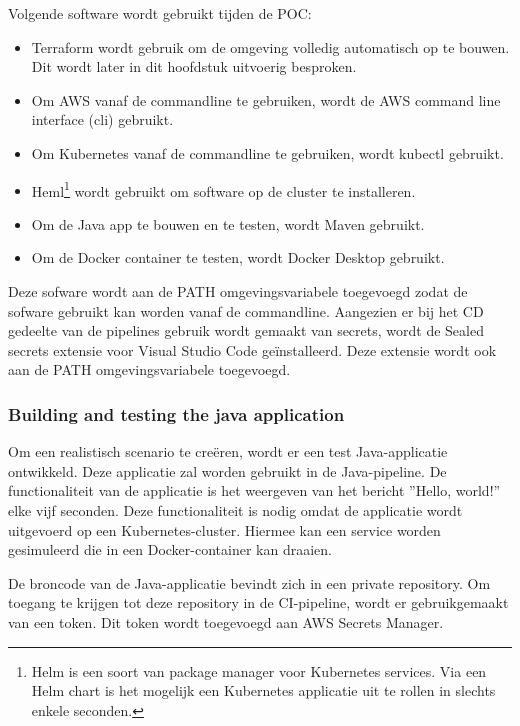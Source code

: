 Volgende software wordt gebruikt tijden de POC:

\begin{itemize}
  \item Terraform wordt gebruik om de omgeving volledig automatisch op te bouwen. Dit wordt later in dit hoofdstuk uitvoerig besproken.
  \item Om AWS vanaf de commandline te gebruiken, wordt de AWS command line interface (cli) gebruikt. 
  \item Om Kubernetes vanaf de commandline te gebruiken, wordt kubectl gebruikt.
  \item Heml\footnote{Helm is een soort van package manager voor Kubernetes services. Via een Helm chart is het mogelijk een Kubernetes applicatie uit te rollen in slechts enkele seconden.} wordt gebruikt om software op de cluster te installeren.
  \item Om de Java app te bouwen en te testen, wordt Maven gebruikt.
  \item Om de Docker container te testen, wordt Docker Desktop gebruikt.
\end{itemize}

Deze sofware wordt aan de PATH omgevingsvariabele toegevoegd zodat de sofware gebruikt kan worden vanaf de commandline. Aangezien er bij het CD gedeelte van de pipelines gebruik wordt gemaakt van secrets, wordt de Sealed secrets extensie voor Visual Studio Code geïnstalleerd. Deze extensie wordt ook aan de PATH omgevingsvariabele toegevoegd.

\subsubsection{
{Building and testing the java application}}
\label{sec:Bouwen en testen van de applicatie}

Om een realistisch scenario te creëren, wordt er een test Java-applicatie ontwikkeld. Deze applicatie zal worden gebruikt in de Java-pipeline. De functionaliteit van de applicatie is het weergeven van het bericht ''Hello, world!'' elke vijf seconden. Deze functionaliteit is nodig omdat de applicatie wordt uitgevoerd op een Kubernetes-cluster. Hiermee kan een service worden gesimuleerd die in een Docker-container kan draaien.
\newline

De broncode van de Java-applicatie bevindt zich in een private repository. Om toegang te krijgen tot deze repository in de CI-pipeline, wordt er gebruikgemaakt van een token. Dit token wordt toegevoegd aan AWS Secrets Manager.
\newline 


